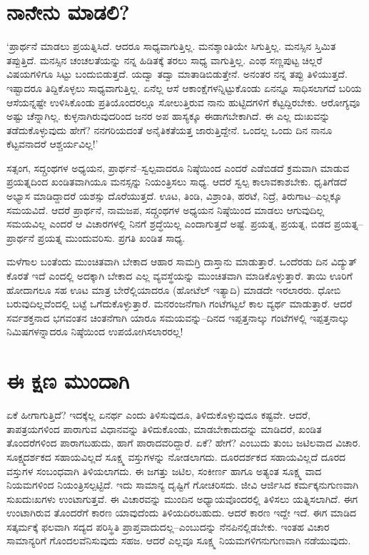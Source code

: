 \section*{ನಾನೇನು ಮಾಡಲಿ?}


‘ಪ್ರಾರ್ಥನೆ ಮಾಡಲು ಪ್ರಯತ್ನಿಸಿದೆ. ಆದರೂ ಸಾಧ್ಯವಾಗುತ್ತಿಲ್ಲ. ಮನಶ್ಶಾಂತಿಯೇ ಸಿಗುತ್ತಿಲ್ಲ. ಮನಸ್ಸಿನ ಸ್ತಿಮಿತ ತಪ್ಪುತ್ತಿದೆ. ಮನಸ್ಸಿನ ಚಂಚಲತೆಯನ್ನು ನನ್ನ ಹಿಡಿತಕ್ಕೆ ತರಲು ಸಾಧ್ಯ ವಾಗುತ್ತಿಲ್ಲ. ಎಂಥ ಸಣ್ಣಪುಟ್ಟ ಚಿಲ್ಲರೆ ವಿಷಯಗಳಿಗೂ ಸಿಟ್ಟು ಬಂದುಬಿಡುತ್ತದೆ. ಯದ್ವಾ ತದ್ವಾ ಮಾತಾಡಿಬಿಡುತ್ತೇನೆ. ಅನಂತರ ನನ್ನ ತಪ್ಪು ತಿಳಿಯುತ್ತದೆ. ಇಷ್ಟಾದರೂ ತಿದ್ದಿಕೊಳ್ಳಲು ಸಾಧ್ಯವಾಗುತ್ತಿಲ್ಲ. ಏನೆಲ್ಲ ಆಸೆ ಆಕಾಂಕ್ಷೆಗಳನ್ನಿಟ್ಟುಕೊಂಡು ಏನನ್ನೂ ಸಾಧಿಸಲಾಗದೆ ಬರಿಯ ಆಸೆಯನ್ನಷ್ಟೇ ಉಳಿಸಿಕೊಂಡು ಪ್ರತಿಯೊಂದರಲ್ಲೂ ಸೋಲುತ್ತಿರುವ ನಾನು ಹುಟ್ಟಿದಗಳಿಗೆ ಕೆಟ್ಟದ್ದಿರಬೇಕು. ಆರೋಗ್ಯವೂ ಅಷ್ಟು ಚೆನ್ನಾಗಿಲ್ಲ. ಕುಳ್ಳನಾಗಿರುವುದರಿಂದ ಜನರ ಅಪ ಹಾಸ್ಯಕ್ಕೂ ಈಡಾಗಬೇಕಾಗಿದೆ. ಈ ಎಲ್ಲ ದುಃಖವನ್ನು ತಡೆದುಕೊಳ್ಳುವುದು ಹೇಗೆ? ನನಗರಿಯದಂತೆ ಅನೈತಿಕತೆಯತ್ತ ಜಾರುತ್ತಿದ್ದೇನೆ. ಒಂದಲ್ಲ ಒಂದು ದಿನ ನಾನೂ ಕೆಟ್ಟವನಾದರೆ ಆಶ್ಚರ್ಯವಿಲ್ಲ!’

ಸತ್ಸಂಗ, ಸದ್ಗ್ರಂಥಗಳ ಅಧ್ಯಯನ, ಪ್ರಾರ್ಥನೆ–ಸ್ವಲ್ಪವಾದರೂ ನಿಷ್ಠೆಯಿಂದ ಎಂದರೆ ಎಡೆ\-ಬಿಡದೆ ಕ್ರಮವಾಗಿ ಮಾಡುವ ಪ್ರಯತ್ನದಿಂದ ಖಂಡಿತವಾಗಿಯೂ ಮನಸ್ಸನ್ನು ನಿಯಂತ್ರಿಸಲು ಸಾಧ್ಯ. ಆದರೆ ಸ್ವಲ್ಪ ಕಾಲಾವಕಾಶಬೇಕು. ಧೃತಿಗೆಡದೆ ಅಭ್ಯಾಸ ಮಾಡಿದ್ದಾದರೆ ಯಶಸ್ಸು ದೊರೆಯುತ್ತದೆ. ಊಟ, ತಿಂಡಿ, ವಿಶ್ರಾಂತಿ, ಹರಟೆ, ನಿದ್ರೆ, ತಿರುಗಾಟ–ಎಲ್ಲಕ್ಕೂ ಸಮಯವಿದೆ. ಆದರೆ ಪ್ರಾರ್ಥನೆ, ನಾಮಜಪ, ಸದ್ಗ್ರಂಥಗಳ ಅಧ್ಯಯನ ನಿಷ್ಠೆಯಿಂದ ಮಾಡಲು ಆಗುವುದಿಲ್ಲ ಸಮಯವಿಲ್ಲ ಎಂದರೆ ಆ ವಿಚಾರಗಳಲ್ಲಿ ನಿನಗೆ ಶ್ರದ್ಧೆಯಿಲ್ಲ ಎಂದಾಗುತ್ತದೆ ಅಷ್ಟೆ. ಪ್ರಯತ್ನ, ಪ್ರಯತ್ನ, ಬಿಡದ ಪ್ರಯತ್ನ–ಪ್ರಾರ್ಥನೆ ಪ್ರಯತ್ನ ಮುಂದುವರಿಸು. ಪ್ರಗತಿ ಖಂಡಿತ ಸಾಧ್ಯ.

ಮಳೆಗಾಲ ಬಂತೆಂದು ಮುಂಚಿತವಾಗಿ ಬೇಕಾದ ಆಹಾರ ಸಾಮಗ್ರಿ ದಾಸ್ತಾನು ಮಾಡುತ್ತಾರೆ. ಒಂದೆರಡು ದಿನ ವಿದ್ಯುತ್ ಕೊರತೆ ಇದೆ ಎಂದಲ್ಲಿ ಅದಕ್ಕಾಗಿ ಬೇಕಾದ ಎಲ್ಲ ವ್ಯವಸ್ಥೆಯನ್ನು ಮುಂಚಿತವಾಗಿ ಮಾಡಿಕೊಳ್ಳುತ್ತಾರೆ. ತಾಯಿ ಊರಿಗೆ ಹೋದಾಗಲೂ ಸಹ ಊಟ ಮಾತ್ರ ಬೇರೆಲ್ಲಿಯಾದರೂ (ಹೋಟೆಲ್ ಇತ್ಯಾದಿ) ಮಾಡದೇ ಇರಲಾರರು. ಧೋಬಿ ಬರುವುದಿಲ್ಲವೆಂದಲ್ಲಿ ಬಟ್ಟೆ ಒಗೆದುಕೊಳ್ಳುತ್ತಾರೆ. ಮನರಂಜನೆಗಾಗಿ ಗಂಟೆಗಟ್ಟಲೆ ಕಾಲ ವ್ಯರ್ಥ ಮಾಡುತ್ತಾರೆ. ಆದರೆ ಸರ್ವಶಕ್ತನಾದ ಭಗವಂತನ ಚಿಂತನೆಗಾಗಿ ಯಾರೂ ಸಮಯವನ್ನು–ದಿನದ ಇಪ್ಪತ್ತನಾಲ್ಕು ಗಂಟೆಗಳಲ್ಲಿ ಇಪ್ಪತ್ತನಾಲ್ಕು ನಿಮಿಷಗಳನ್ನಾದರೂ ನಿಷ್ಠೆಯಿಂದ ಉಪಯೋಗಿಸಲಾರರಲ್ಲ!


\section*{ಈ ಕ್ಷಣ ಮುಂದಾಗಿ}


ಏಕೆ ಹೀಗಾಗುತ್ತಿದೆ? ಇದಕ್ಕೆಲ್ಲ ಏನರ್ಥ ಎಂದು ತಿಳಿಸುವುದೂ, ತಿಳಿದುಕೊಳ್ಳುವುದೂ ಕಷ್ಟವೇ. ಆದರೆ, ತಾಪತ್ರಯಗಳಿಂದ ಪಾರಾಗುವ ವಿಧಾನವನ್ನು ತಿಳಿದುಕೊಂಡು, ಮಾಡಬೇಕಾದುದನ್ನು ಮಾಡಿದರೆ, ಖಂಡಿತ ತೊಂದರೆಗಳಿಂದ ಪಾರಾಗಬಹುದು, ಹಾಗೆ ಪಾರಾದವರಿದ್ದಾರೆ. ಏಕೆ? ಹೇಗೆ? ಎಂಬುದು ತುಂಬ ಜಟಿಲವಾದ ವಿಚಾರ. ಸೂಕ್ಷ್ಮದರ್ಶಕದ ಸಹಾಯವಿಲ್ಲದೆ ಸೂಕ್ಷ್ಮ ವಸ್ತುಗಳನ್ನು ನೋಡಲಾಗದು. ದೂರದರ್ಶಕದ ಸಹಾಯವಿಲ್ಲದೆ ದೂರದ ವಸ್ತುಗಳ ಸಂಬಂಧವಾಗಿ ತಿಳಿಯಲಾಗದು. ಈ ಜಗತ್ತು ಜಟಿಲ, ಸಂಕೀರ್ಣ ಹಾಗೂ ಅತ್ಯಂತ ಸೂಕ್ಷ್ಮ ವಾದ ನಿಯಮಗಳಿಂದ ನಿಯಂತ್ರಿಸಲ್ಪಟ್ಟಿದೆ. ಇದು ಸಾಮಾನ್ಯ ದೃಷ್ಟಿಗೆ ಗೋಚರಿಸದು. ಜೀವಿ ಆರ್ಜಿಸಿದ ಕರ್ಮಕ್ಕನುಗುಣವಾಗಿ ಸುಖದುಃಖಗಳು ಉಂಟಾಗುತ್ತವೆ. ಈ ವಿಚಾರವನ್ನು ಮುಂದಿನ ಅಧ್ಯಾಯ\-ವೊಂದರಲ್ಲಿ ತಿಳಿಸಲು ಯತ್ನಿಸಲಾಗಿದೆ. ಈಗ ಉಂಟಾಗಿರುವ ತೊಂದರೆಗೆ ಕಾರಣ ಯಾವುದೆಂದು ತಿಳಿಯದಿರಬಹುದು. ಆದರೆ ಕಾರಣ ಇದ್ದೇ ಇದೆ. ಈಗ ಮಾಡಿದ ಸತ್ಕರ್ಮಕ್ಕೆ ಫಲವಾಗಿ ಸದ್ಯದ ಪರಿಸ್ಥಿತಿ ಪ್ರಾಪ್ತವಾದುದಲ್ಲ–ಎಂಬುದನ್ನು ನೆನಪಿನಲ್ಲಿಡಬೇಕು. ಇಂತಹ ವಿಚಾರ ಸಾಮಾನ್ಯರಿಗೆ ಗೊಂದಲವೆನಿಸುವುದು ಸಹಜ. ಆದರೆ ಎಲ್ಲವೂ ಸೂಕ್ಷ್ಮ ನಿಯಮಗಳಿಗನುಗುಣವಾಗಿ ನಡೆಯುವುದು.

